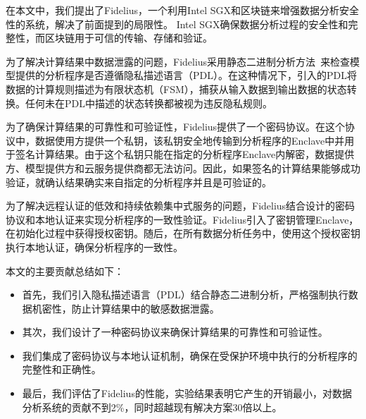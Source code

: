 在本文中，我们提出了Fidelius，一个利用Intel SGX和区块链来增强数据分析安全性的系统，解决了前面提到的局限性。
Intel SGX确保数据分析过程的安全性和完整性，而区块链用于可信的传输、存储和验证。

为了解决计算结果中数据泄露的问题，Fidelius采用静态二进制分析方法~\cite{schulte2019gtirb}来检查模型提供的分析程序是否遵循隐私描述语言（PDL）。在这种情况下，引入的PDL将数据的计算规则描述为有限状态机（FSM），捕获从输入数据到输出数据的状态转换。任何未在PDL中描述的状态转换都被视为违反隐私规则。

为了确保计算结果的可靠性和可验证性，Fidelius提供了一个密码协议。在这个协议中，数据使用方提供一个私钥，该私钥安全地传输到分析程序的Enclave中并用于签名计算结果。由于这个私钥只能在指定的分析程序Enclave内解密，数据提供方、模型提供方和云服务提供商都无法访问。因此，如果签名的计算结果能够成功验证，就确认结果确实来自指定的分析程序并且是可验证的。

为了解决远程认证的低效和持续依赖集中式服务的问题，Fidelius结合设计的密码协议和本地认证来实现分析程序的一致性验证。Fidelius引入了密钥管理Enclave，在初始化过程中获得授权密钥。随后，在所有数据分析任务中，使用这个授权密钥执行本地认证，确保分析程序的一致性。

本文的主要贡献总结如下：
\begin{itemize}
    \item 首先，我们引入隐私描述语言（PDL）结合静态二进制分析，严格强制执行数据机密性，防止计算结果中的敏感数据泄露。
    \item 其次，我们设计了一种密码协议来确保计算结果的可靠性和可验证性。
    \item 我们集成了密码协议与本地认证机制，确保在受保护环境中执行的分析程序的完整性和正确性。
    \item 最后，我们评估了Fidelius的性能，实验结果表明它产生的开销最小，对数据分析系统的贡献不到2\%，同时超越现有解决方案30倍以上。
\end{itemize} 